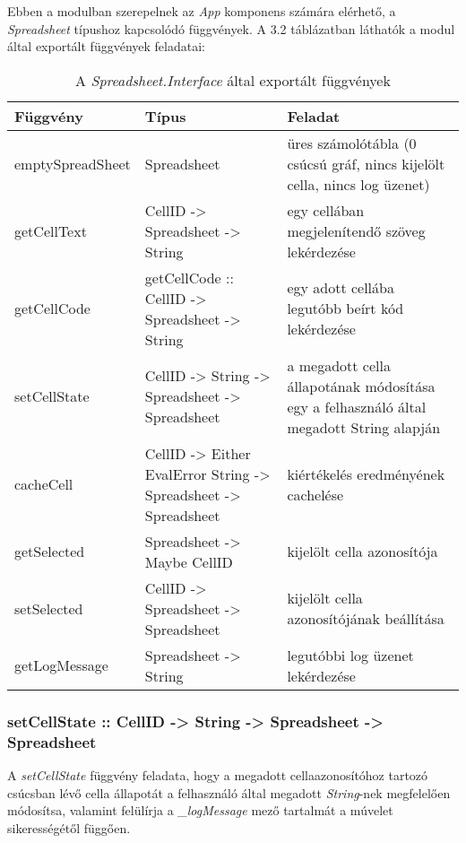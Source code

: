 Ebben a modulban szerepelnek az \textit{App} komponens számára elérhető, a \textit{Spreadsheet} típushoz kapcsolódó függvények. A 3.2 táblázatban láthatók a modul által exportált függvények feladatai:

\begin{table}
	\centering
	\begin{tabularx}{\textwidth}{ |l|X|X|}
		\hline
		Függvény & Típus & Feladat \\
		\hline\hline
		emptySpreadSheet & Spreadsheet & üres számolótábla (0 csúcsú gráf, nincs kijelölt cella, nincs log üzenet) \\
		\hline
		getCellText & CellID -> Spreadsheet -> String & egy cellában megjelenítendő szöveg lekérdezése \\
		\hline
		getCellCode & getCellCode :: CellID -> Spreadsheet -> String & egy adott cellába legutóbb beírt kód lekérdezése \\
		\hline
		setCellState & CellID -> String -> Spreadsheet -> Spreadsheet & a megadott cella állapotának módosítása egy a felhasználó által megadott String alapján \\
		\hline
		cacheCell & CellID -> Either EvalError String -> Spreadsheet -> Spreadsheet & kiértékelés eredményének cachelése \\
		\hline
		getSelected & Spreadsheet -> Maybe CellID & kijelölt cella azonosítója \\
		\hline
		setSelected & CellID -> Spreadsheet -> Spreadsheet & kijelölt cella azonosítójának beállítása \\
		\hline 
		getLogMessage & Spreadsheet -> String & legutóbbi log üzenet lekérdezése \\
		\hline
	\end{tabularx}
	\caption[A \textit{Spreadsheet.Interface} által exportált függvények]{A \textit{Spreadsheet.Interface} által exportált függvények}
	\label{tab:interface}
\end{table}

\subsubsection{setCellState :: CellID -> String -> Spreadsheet -> Spreadsheet}

A \textit{setCellState} függvény feladata, hogy a megadott cellaazonosítóhoz tartozó csúcsban lévő cella állapotát a felhasználó által megadott \textit{String}-nek megfelelően módosítsa, valamint felülírja a \textit{\_logMessage} mező tartalmát a múvelet sikerességétől függően.

